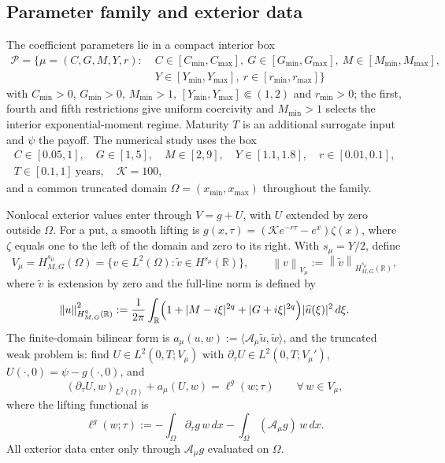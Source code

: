 \documentclass[hidelinks]{siamart251216}
\newcommand{\R}{\mathbb{R}}
\newcommand{\Pset}{\mathcal{P}}
\newcommand{\Vmu}{V_{\mu}}
\newcommand{\norm}[1]{\left\lVert #1\right\rVert}
\newcommand{\rf}{r}
\newcommand{\Hs}{H^{s_\mu}_{M,G}}
\newcommand{\Aop}{\mathcal A_\mu}
\begin{document}
\subsection{Parameter family and exterior data}
\label{ssec:family}\label{ssec:finite-domain}
The coefficient parameters lie in a compact interior box
\begin{equation}
\begin{aligned}
 \Pset=\bigl\{\mu=(C,G,M,Y,\rf):\;&
 C\in[C_{\min},C_{\max}],\ G\in[G_{\min},G_{\max}],\ M\in[M_{\min},M_{\max}],\\
 &Y\in[Y_{\min},Y_{\max}],\ \rf\in[r_{\min},r_{\max}]\bigr\}
\end{aligned}
 \label{eq:parameter-set}
\end{equation}
with $C_{\min}>0$, $G_{\min}>0$, $M_{\min}>1$, $[Y_{\min},Y_{\max}]\Subset(1,2)$ and $r_{\min}>0$;
the first, fourth and fifth restrictions give uniform coercivity and $M_{\min}>1$ selects the
interior exponential-moment regime.  Maturity $T$ is an additional surrogate input and $\psi$ the
payoff.  The numerical study uses the box
\begin{equation}
\begin{gathered}
 C\in[0.05,1],\quad G\in[1,5],\quad M\in[2,9],\quad Y\in[1.1,1.8],\quad \rf\in[0.01,0.1],\\
 T\in[0.1,1]\ \text{years},\quad \mathcal K=100,
\end{gathered}
 \label{eq:numerical-box}
\end{equation}
and a common truncated domain $\Omega=(x_{\min},x_{\max})$ throughout the family.

Nonlocal exterior values enter through $V=g+U$, with $U$ extended by zero
outside $\Omega$. For a put, a smooth lifting is
$g(x,\tau)=(\mathcal Ke^{-r\tau}-e^x)\zeta(x)$, where $\zeta$ equals one to the left
of the domain and zero to its right. With $s_\mu=Y/2$, define
\begin{equation}
  \Vmu=\Hs(\Omega)
  =\bigl\{v\in L^2(\Omega):\widetilde v\in H^{s_\mu}(\R)\bigr\},
  \qquad
  \norm{v}_{\Vmu}:=\norm{\widetilde v}_{H^{s_\mu}_{M,G}(\R)},
  \label{eq:energy-space}
\end{equation}
where $\widetilde v$ is extension by zero and the full-line norm is defined by
\begin{equation}
  \norm{u}_{H^{q}_{M,G}(\R)}^2
  :=\frac1{2\pi}\int_\R
  \Bigl(1+|M-i\xi|^{2q}+|G+i\xi|^{2q}\Bigr)|\widehat u(\xi)|^2\,d\xi .
  \label{eq:HMG-norm}
\end{equation}
The finite-domain bilinear form is
$a_\mu(u,w):=\langle\Aop\widetilde u,\widetilde w\rangle$, and the truncated
weak problem is: find $U\in L^2(0,T;\Vmu)$ with
$\partial_\tau U\in L^2(0,T;\Vmu')$, $U(\cdot,0)=\psi-g(\cdot,0)$, and
\begin{equation}
  (\partial_\tau U,w)_{L^2(\Omega)}+a_\mu(U,w)=\ell^g(w;\tau)
  \qquad\forall\,w\in\Vmu,
  \label{eq:weak-problem}
\end{equation}
where the lifting functional is
\begin{equation}
  \ell^{g}(w;\tau)
  :=-\int_\Omega\partial_\tau g\,w\,dx-\int_\Omega(\Aop g)\,w\,dx .
  \label{eq:lifting-functional}
\end{equation}
All exterior data enter only through $\Aop g$ evaluated on $\Omega$.
\end{document}
